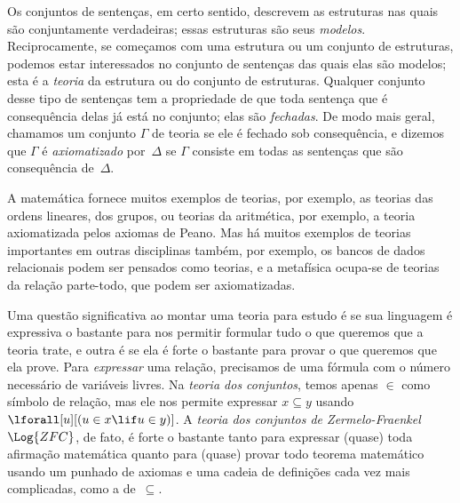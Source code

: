 Os conjuntos de sentenças, em certo sentido, descrevem as estruturas nas quais são
conjuntamente verdadeiras; essas estruturas são seus \emph{modelos}. Reciprocamente,
se começamos com uma estrutura ou um conjunto de estruturas, podemos estar
interessados no conjunto de sentenças das quais elas são modelos; esta é a
\emph{teoria} da estrutura ou do conjunto de estruturas. Qualquer conjunto desse tipo de
sentenças tem a propriedade de que toda sentença que é consequência delas já
está no conjunto; elas são \emph{fechadas}. De modo mais geral, chamamos um
conjunto $\Gamma$ de teoria se ele é fechado sob consequência, e dizemos que
$\Gamma$ é \emph{axiomatizado} por~$\Delta$ se $\Gamma$ consiste em todas as
sentenças que são consequência de~$\Delta$.

A matemática fornece muitos exemplos de teorias, por exemplo, as teorias das
ordens lineares, dos grupos, ou teorias da aritmética, por exemplo, a teoria
axiomatizada pelos axiomas de Peano. Mas há muitos exemplos de
teorias importantes em outras disciplinas também, por exemplo, os bancos de dados
relacionais podem ser pensados como teorias, e a metafísica ocupa-se
de teorias da relação parte-todo, que podem ser axiomatizadas.

Uma questão significativa ao montar uma teoria para estudo é se
sua linguagem é expressiva o bastante para nos permitir formular tudo o que
queremos que a teoria trate, e outra é se ela é forte
o bastante para provar o que queremos que ela prove. Para \emph{expressar} uma
relação, precisamos de uma fórmula com o número necessário de variáveis
livres. Na \emph{teoria dos conjuntos}, temos apenas $\in$ como símbolo de
relação, mas ele nos permite expressar $x \subseteq y$ usando
$\lforall[u][(u \in x \lif u \in y)]$. A \emph{teoria dos conjuntos de
  Zermelo-Fraenkel}~$\Log{ZFC}$, de fato, é forte o bastante tanto para expressar
(quase) toda afirmação matemática quanto para (quase) provar todo
teorema matemático usando um punhado de axiomas e uma cadeia de
definições cada vez mais complicadas, como a de~$\subseteq$.
